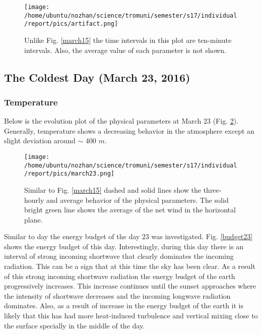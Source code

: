 \documentclass[a4paper,12pt]{article}
\numberwithin{equation}{section} %
\begin{document}
\begin{figure}[bhp]
\texttt{[image: /home/ubuntu/nozhan/science/tromuni/semester/s17/individual/report/pics/artifact.png]}
\caption{Unlike Fig. \ref{march15} the time intervals in this plot are ten-minute intervals. Also, the average value of each parameter is not shown.}
\label{artifact}
\end{figure}


\subsection{The Coldest Day (March 23, 2016)}

\subsubsection{Temperature}

Below is the evolution plot of the physical parameters at March 23 (Fig. \ref{march23}). Generally, temperature shows a decreasing behavior in the atmosphere except an slight deviation around $\sim$ 400 $m$.

\begin{figure}[bhp]
\texttt{[image: /home/ubuntu/nozhan/science/tromuni/semester/s17/individual/report/pics/march23.png]}
\caption{Similar to Fig. \ref{march15} dashed and solid lines show the three-hourly and average behavior of the physical parameters. The solid bright green line shows the average of the net wind in the horizontal plane.}
\label{march23}
\end{figure}

\vspace{0.5cm}

Similar to day  the energy budget of the day 23 was investigated. Fig. \ref{budget23} shows the energy budget of this day. Interestingly, during this day there is an interval of strong incoming shortwave that clearly dominates the incoming radiation. This can be a sign that at this time the sky has been clear. As a result of this strong incoming shortwave radiation the energy budget of the earth progressively increases. This increase continues until the sunset approaches where the intensity of shortwave decreases and the incoming longwave radiation dominates. Also, as a result of increase in the energy budget of the earth it is likely that this has had more heat-induced turbulence and vertical mixing close to the surface specially in the middle of the day. 

\vspace{0.35cm}
\end{document}
